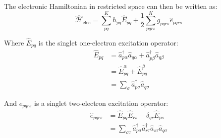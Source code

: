 The electronic Hamiltonian in restricted space can then be written as:         
  \begin{equation}\label{eq:ham_sf}
          \hat{\mathcal{H}}_\text{elec} =  \sum_{pq}^K h_{pq} \hat{E}_{pq} + \frac{1}{2}  \sum_{pqrs}^K g_{pqrs} \hat{e}_{pqrs}
 \end{equation}        
 
  Where $\hat{E}_{pq}$ is the singlet one-electron excitation operator:
        \begin{align}
            \hat{E}_{pq} &= \hat{a}^\dagger_{p\alpha} \hat{a}_{q\alpha} + \hat{a}^\dagger_{p \beta} \hat{a}_{q \beta} \\
            &= \hat{E}^\alpha_{pq} + \hat{E}^\beta_{pq} \label{eq:E_pq_alpha_beta} \\
            &= \sum_\sigma \hat{a}^\dagger_{p \sigma} \hat{a}_{q \sigma} 
\end{align} 

        And $\hat{e}_{pqrs}$ is a singlet two-electron excitation operator:
        \begin{align}
            \hat{e}_{pqrs} &= \hat{E}_{pq} \hat{E}_{rs} - \delta_{qr} \hat{E}_{ps} \\
            &= \sum_{\sigma \tau} \hat{a}^\dagger_{p \sigma} \hat{a}^\dagger_{r \tau} \hat{a}_{s \tau} \hat{a}_{q \sigma} \label{eq:two_electron_excitation_operator}
        \end{align}
        

